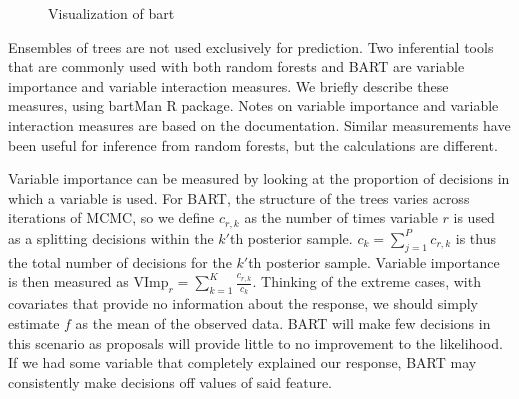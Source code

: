 \documentclass[
  12pt,
  letterpaper,
  DIV=11,
  numbers=noendperiod]{scrartcl}
\begin{document}
\begin{figure}[H]


\caption{\label{fig-bart-sim1}Visualization of bart}

\end{figure}%

Ensembles of trees are not used exclusively for prediction. Two
inferential tools that are commonly used with both random forests and
BART are variable importance and variable interaction measures. We
briefly describe these measures, using \cite{bartMan} bartMan R package.
Notes on variable importance and variable interaction measures are based
on the documentation. Similar measurements have been useful for
inference from random forests, but the calculations are different.

Variable importance can be measured by looking at the proportion of
decisions in which a variable is used. For BART, the structure of the
trees varies across iterations of MCMC, so we define \(c_{r,k}\) as the
number of times variable \(r\) is used as a splitting decisions within
the \(k'\)th posterior sample. \(c_k=\sum_{j=1}^Pc_{r,k}\) is thus the
total number of decisions for the \(k'\)th posterior sample. Variable
importance is then measured as
\(\text{VImp}_r=\sum_{k=1}^K\frac{c_{r,k}}{c_k}\). Thinking of the
extreme cases, with covariates that provide no information about the
response, we should simply estimate \(f\) as the mean of the observed
data. BART will make few decisions in this scenario as proposals will
provide little to no improvement to the likelihood. If we had some
variable that completely explained our response, BART may consistently
make decisions off values of said feature.
\end{document}
